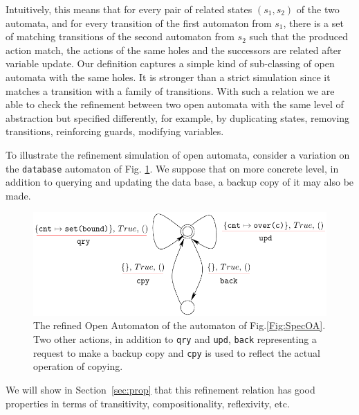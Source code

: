 \documentclass[runningheads]{llncs}
\begin{document}
Intuitively, this means that for every pair of related
states $(s_1,s_2)$  of the two automata, and for every  transition of the first automaton from $s_1$, there is a set of matching transitions  of the second automaton  from $s_2$ such that the produced action match, the actions of the same holes and the successors are related after variable update. Our definition captures a simple kind of sub-classing of open automata with the same holes. It is stronger than a strict simulation since it matches a transition with a family of transitions. 
With such a relation we are able to check the refinement between two open automata with the same level of abstraction but specified differently, for example, by duplicating states, removing transitions,  reinforcing  guards, modifying variables. 

To illustrate the refinement simulation of open automata, consider a variation on the \texttt{database} automaton of Fig. \ref{Fig:RefineOA}. We suppose that on more concrete level, in addition to querying and updating the data base,  a backup copy of it may also be made.

\begin{figure}[h]
 \centering
   \includegraphics[width=.9\textwidth]{Figures/databaseRefine.pdf}
   \caption{The refined Open Automaton of the automaton of Fig.\ref{Fig:SpecOA}.  Two other actions,  in addition to  \texttt{qry} and \texttt{upd},  \texttt{back} representing a request to make a backup copy and    \texttt{cpy} is used to reflect the actual operation of copying. \label{Fig:RefineOA}}
\end{figure}



 We will show in Section~\ref{sec:prop} that this refinement relation has good properties in terms of transitivity, compositionality, reflexivity, etc.
\end{document}

